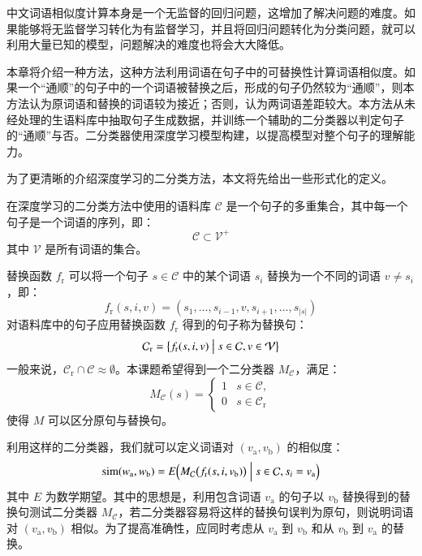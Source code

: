 
\label{c:classifer}
中文词语相似度计算本身是一个无监督的回归问题，这增加了解决问题的难度。如果能够将无监督学习转化为有监督学习，并且将回归问题转化为分类问题，就可以利用大量已知的模型，问题解决的难度也将会大大降低。

本章将介绍一种方法，这种方法利用词语在句子中的可替换性计算词语相似度。如果一个“通顺”的句子中的一个词语被替换之后，形成的句子仍然较为“通顺”，则本方法认为原词语和替换的词语较为接近；否则，认为两词语差距较大。本方法从未经处理的生语料库中抽取句子生成数据，并训练一个辅助的二分类器以判定句子的“通顺”与否。二分类器使用深度学习模型构建，以提高模型对整个句子的理解能力。

\label{s:classifer pricinple}
为了更清晰的介绍深度学习的二分类方法，本文将先给出一些形式化的定义。

在深度学习的二分类方法中使用的语料库 $\mathcal{C}$ 是一个句子的多重集合，其中每一个句子是一个词语的序列，即：
\begin{equation}
\mathcal{C} \subset \mathcal{V}^+
\label{e:corpus}
\end{equation}
其中 $\mathcal{V}$ 是所有词语的集合。

替换函数 $f_\text{r}$ 可以将一个句子 $s \in \mathcal{C}$ 中的某个词语 $s_i$ 替换为一个不同的词语 $v \ne s_i$，即：
\begin{equation}
f_\text{r}(s, i, v) = (s_1, \dots, s_{i - 1}, v, s_{i + 1}, \dots, s_{|s|})
\end{equation}
对语料库中的句子应用替换函数 $f_\text{r}$ 得到的句子称为替换句：
\begin{equation}
\mathcal{C}_\text{r} = \bigl\{f_\text{r}(s, i, v) \bigm| s \in \mathcal{C}, v \in \mathcal{V}\bigr\}
\end{equation}
一般来说，$\mathcal{C}_\text{r} \cap \mathcal{C} \approx \emptyset$。本课题希望得到一个二分类器 $M_\mathcal{C}$，满足：
\begin{equation}
M_\mathcal{C}(s) = 
\begin{cases}
1 & s \in \mathcal{C}, \\
0 & s \in \mathcal{C}_\text{r}
\end{cases}
\end{equation}
使得 $M$ 可以区分原句与替换句。

利用这样的二分类器，我们就可以定义词语对 $(v_\text{a}, v_\text{b})$ 的相似度：
\begin{equation}
\operatorname{sim}(w_\text{a}, w_\text{b}) = E\Bigl(M_\mathcal{C}\bigl(f_\text{r}(s, i, v_\text{b})\bigr) \Bigm| s \in \mathcal{C}, s_i = v_\text{a}\Bigr)
\label{e:avg}
\end{equation}
其中 $E$ 为数学期望。其中的思想是，利用包含词语 $v_\text{a}$ 的句子以 $v_\text{b}$ 替换得到的替换句测试二分类器 $M_\mathcal{C}$，若二分类器容易将这样的替换句误判为原句，则说明词语对 $(v_\text{a}, v_\text{b})$ 相似。为了提高准确性，应同时考虑从 $v_\text{a}$ 到 $v_\text{b}$ 和从 $v_\text{b}$ 到 $v_\text{a}$ 的替换。

